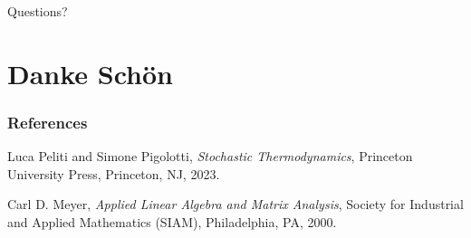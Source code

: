 \documentclass[9pt]{beamer}
\begin{document}
\begin{frame}[standout]

  Questions?
\end{frame}
\section{Danke Schön}
\begin{frame}
  \frametitle{References}
  \begin{thebibliography}{99}

    Luca Peliti and Simone Pigolotti, \textit{Stochastic Thermodynamics}, 
    Princeton University Press, Princeton, NJ, 2023.
    
    Carl D. Meyer, \textit{Applied Linear Algebra and Matrix Analysis}, 
    Society for Industrial and Applied Mathematics (SIAM), Philadelphia, PA, 2000.
    
    \end{thebibliography}

\end{frame}
\end{document}
